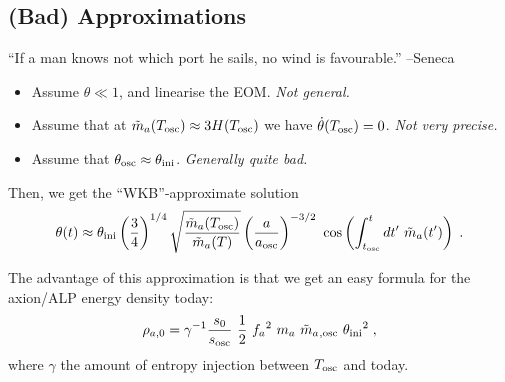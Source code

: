 \documentclass[10pt,utf8,compress,xcolor=dvipsnames]{beamer}
\begin{document}
\subsection{(Bad) Approximations}
\begin{frame}{\insertsubsectionhead}


	\begin{center}
		``If a man knows not which port he sails, no wind is favourable.''
		\flushright --Seneca %
	\end{center}


%		
	\begin{itemize}
		\item Assume $\theta \ll 1$, and linearise the EOM. {\sl Not general.}\pause
		\item Assume that at $\tilde m_{a}{}(T_{\rm osc}{}) \approx 3H(T_{\rm osc}{})$ we have $\dot\theta(T_{\rm osc}{})=0$. {\sl Not very precise.}\pause
		\item Assume that $\theta_{\rm osc}{} \approx \theta_{\rm ini}{}$. {\sl Generally quite bad.}\pause
	\end{itemize}
	
	Then, we get the ``WKB''-approximate solution
	\begin{equation*}\vspace*{-0.2cm}
		\theta(t) \approx \thetai \lrb{\dfrac{3}{4}}^{1/4} \sqrt{ \dfrac{ \maT(\Tosc) }{\maT(T)} } \lrb{\dfrac{a}{\aosc}}^{-3/2} \  \cos\lrb{ \int_{\tosc}^t d t^\prime  \ \maT(t^\prime)}   \;.
	\end{equation*}
	
	The advantage of this approximation is that we get an easy formula for the axion/ALP energy density today:
	\begin{equation*}\vspace*{-0.2cm}		
		\rho_{a,0} = \gamma^{-1}  \dfrac{s_0}{s_{\rm osc}} \  \dfrac{1 }{2}  \ \fa^2 \ \ma \ \maT_{,{\rm osc}} \ \thetai^2    \;,
	\end{equation*}
	where $\gamma$ the amount of entropy injection between $T_{\rm osc}{}$ and today.%
\end{frame}
\end{document}
